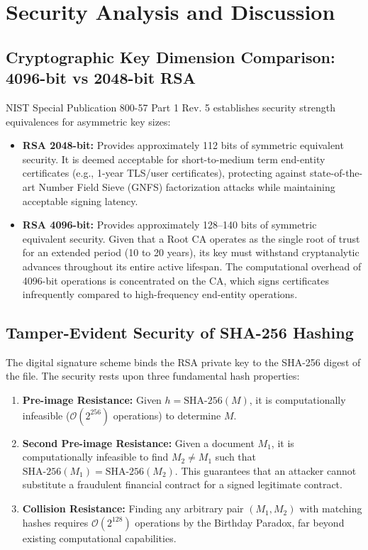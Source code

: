 \documentclass[12pt,a4paper]{article}
\begin{document}
\section{Security Analysis and Discussion}

\subsection{Cryptographic Key Dimension Comparison: 4096-bit vs 2048-bit RSA}
NIST Special Publication 800-57 Part 1 Rev. 5 establishes security strength equivalences for asymmetric key sizes:
\begin{itemize}
    \item \textbf{RSA 2048-bit:} Provides approximately 112 bits of symmetric equivalent security. It is deemed acceptable for short-to-medium term end-entity certificates (e.g., 1-year TLS/user certificates), protecting against state-of-the-art Number Field Sieve (GNFS) factorization attacks while maintaining acceptable signing latency.
    \item \textbf{RSA 4096-bit:} Provides approximately 128--140 bits of symmetric equivalent security. Given that a Root CA operates as the single root of trust for an extended period (10 to 20 years), its key must withstand cryptanalytic advances throughout its entire active lifespan. The computational overhead of 4096-bit operations is concentrated on the CA, which signs certificates infrequently compared to high-frequency end-entity operations.
\end{itemize}

\subsection{Tamper-Evident Security of SHA-256 Hashing}
The digital signature scheme binds the RSA private key to the SHA-256 digest of the file. The security rests upon three fundamental hash properties:
\begin{enumerate}
    \item \textbf{Pre-image Resistance:} Given $h = \text{SHA-256}(M)$, it is computationally infeasible ($\mathcal{O}(2^{256})$ operations) to determine $M$.
    \item \textbf{Second Pre-image Resistance:} Given a document $M_1$, it is computationally infeasible to find $M_2 \neq M_1$ such that $\text{SHA-256}(M_1) = \text{SHA-256}(M_2)$. This guarantees that an attacker cannot substitute a fraudulent financial contract for a signed legitimate contract.
    \item \textbf{Collision Resistance:} Finding any arbitrary pair $(M_1, M_2)$ with matching hashes requires $\mathcal{O}(2^{128})$ operations by the Birthday Paradox, far beyond existing computational capabilities.
\end{enumerate}
\end{document}
